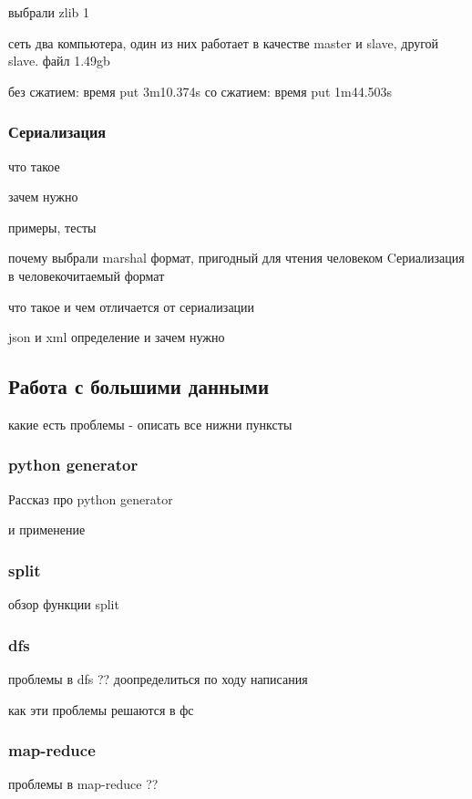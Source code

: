\documentclass[12pt,a4paper,oneside]{extarticle}
\begin{document}
            выбрали zlib 1


            сеть два компьютера, один из них работает в качестве master и slave, другой slave.
            файл 1.49gb

            без сжатием:
                время put 3m10.374s
            со сжатием:
                время put 1m44.503s


        \subsubsection{Сериализация}
            что такое

            зачем нужно

            примеры, тесты

            почему выбрали marshal
            формат, пригодный для чтения человеком
            Cериализация в человекочитаемый формат %

            что такое и чем отличается от сериализации

            json и xml определение и зачем нужно

    \clearpage

    \subsection{Работа с большими данными}

        какие есть проблемы - описать все нижни пунксты

        \subsubsection{python generator}
            Рассказ про python generator

            и применение

        \subsubsection{split}
            обзор функции split

        \subsubsection{dfs}
            проблемы в dfs ?? доопределиться по ходу написания

            как эти проблемы решаются в фс
        \subsubsection{map-reduce}
            проблемы в map-reduce ??
\end{document}
